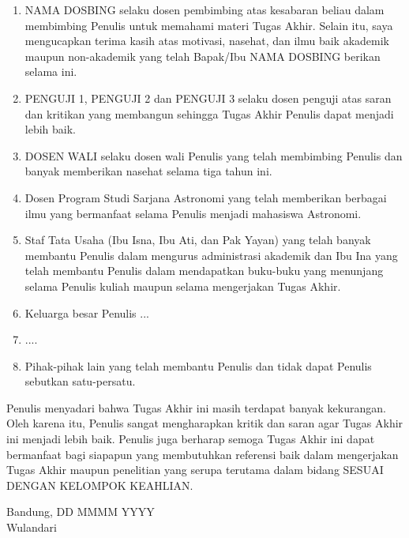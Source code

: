 \begin{enumerate}
	\item NAMA DOSBING selaku dosen pembimbing atas kesabaran beliau dalam membimbing Penulis untuk memahami materi Tugas Akhir. Selain itu, saya mengucapkan terima kasih atas motivasi, nasehat, dan ilmu baik akademik maupun non-akademik yang telah Bapak/Ibu NAMA DOSBING berikan selama ini. 
	\item PENGUJI 1, PENGUJI 2 dan PENGUJI 3 selaku dosen penguji atas saran dan kritikan yang membangun sehingga Tugas Akhir Penulis dapat menjadi lebih baik. 
	\item DOSEN WALI selaku dosen wali Penulis yang telah membimbing Penulis dan banyak memberikan nasehat selama tiga tahun ini. 
	\item Dosen Program Studi Sarjana Astronomi yang telah memberikan berbagai ilmu yang bermanfaat selama Penulis menjadi mahasiswa Astronomi. 
	\item Staf Tata Usaha (Ibu Isna, Ibu Ati, dan Pak Yayan) yang telah banyak membantu Penulis dalam mengurus administrasi akademik dan Ibu Ina yang telah membantu Penulis dalam mendapatkan buku-buku yang menunjang selama Penulis kuliah maupun selama mengerjakan Tugas Akhir.  
	\item Keluarga besar Penulis ...
	\item ....
	\item Pihak-pihak lain yang telah membantu Penulis dan tidak dapat Penulis sebutkan satu-persatu. 
\end{enumerate}
Penulis menyadari bahwa Tugas Akhir ini masih terdapat banyak kekurangan. Oleh karena itu, Penulis sangat mengharapkan kritik dan saran agar Tugas Akhir ini menjadi lebih baik. Penulis juga berharap semoga Tugas Akhir ini dapat bermanfaat bagi siapapun yang membutuhkan referensi baik dalam mengerjakan Tugas Akhir maupun penelitian yang serupa terutama dalam bidang SESUAI DENGAN KELOMPOK KEAHLIAN.\\
\vspace{1cm}
\begin{flushright}
Bandung, DD MMMM YYYY\\
\vspace{2cm}
Wulandari
\end{flushright}
